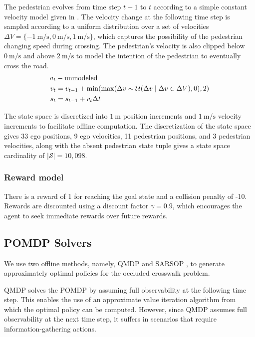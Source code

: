 \documentclass[conference]{IEEEtran}
\begin{document}
The pedestrian evolves from time step $t-1$ to $t$ according to a simple constant velocity model given in . The velocity change at the following time step is sampled according to a uniform distribution over a set of velocities $\Delta V = \{-1~\si{\meter\per\second}, 0~\si{\meter\per\second}, 1~\si{\meter\per\second}\}$, which captures the possibility of the pedestrian changing speed during crossing. The pedestrian's velocity is also clipped below $0~ \si{\meter\per\second}$ and above $2~ \si{\meter\per\second}$ to model the intention of the pedestrian to eventually cross the road.
\begin{align}
    a_t &- \textnormal{unmodeled} \nonumber \\
    v_t &= v_{t-1} + \min(\max(\Delta v \sim \mathcal{U}(\Delta v \mid \Delta v \in \Delta V), 0), 2) \label{eq:ped_transition} \\
    s_t &= s_{t-1} + v_t \Delta t \nonumber 
\end{align}

The state space is discretized into $1 ~\si{\meter}$ position increments and $1 ~\si{\meter\per\second}$ velocity increments to facilitate offline computation. The discretization of the state space gives 33 ego positions, 9 ego velocities, 11 pedestrian positions, and 3 pedestrian velocities, along with the absent pedestrian state tuple gives a state space cardinality of $|\mathcal{S}| = 10,098$.

\subsubsection{Reward model} There is a reward of 1 for reaching the goal state and a collision penalty of -10. Rewards are discounted using a discount factor $\gamma = 0.9$, which encourages the agent to seek immediate rewards over future rewards.

\subsection{POMDP Solvers}

We use two offline methods, namely, QMDP \cite{Littman1995LearningUp} and SARSOP \cite{Kurniawati2009SARSOP:Spaces}, to generate approximately optimal policies for the occluded crosswalk problem.

QMDP solves the POMDP by assuming full observability at the following time step. This enables the use of an approximate value iteration algorithm from which the optimal policy can be computed. However, since QMDP assumes full observability at the next time step, it suffers in scenarios that require information-gathering actions.
\end{document}
